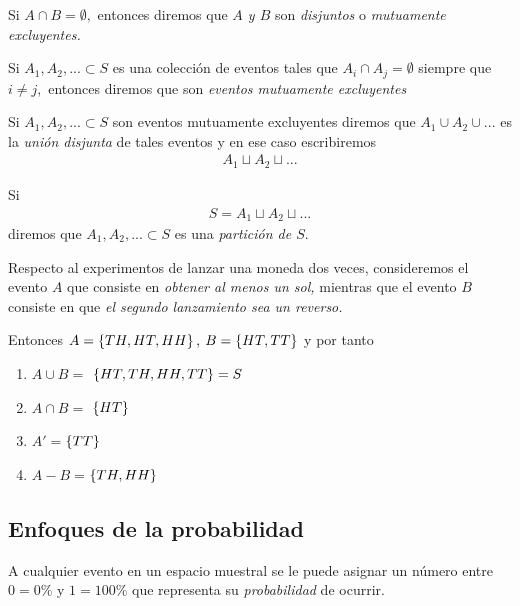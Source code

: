 Si $A\cap B= \emptyset,$ entonces diremos que \emph{$A$ y $B$} son \emph{disjuntos} o \emph{mutuamente excluyentes.} 

\begin{definicion}
	Si $A_{1},A_{2},... \subset S$ es una colección de eventos tales que $A_{i}\cap A_{j}=\emptyset$ siempre que $i\neq j,$ entonces diremos que son \emph{eventos mutuamente excluyentes}
\end{definicion}

\begin{definicion}
	Si $A_{1}, A_{2}, ...\subset S$ son eventos mutuamente excluyentes diremos que $A_{1} \cup A_{2} \cup ... $ es la \emph{unión disjunta} de tales eventos y en ese caso escribiremos
	\begin{align}
		A_{1}\sqcup A_{2} \sqcup ...
	\end{align}
\end{definicion}


\begin{definicion}
	Si \begin{align}
		S=A_{1}\sqcup A_{2} \sqcup ...
	\end{align}
	diremos que $A_{1},A_{2},...\subset S$  es una \emph{partición de $S.$}
\end{definicion}


\begin{ejemplo}
	\label{exmp:1.9}
	Respecto al experimentos de lanzar una moneda dos veces, consideremos el evento $A$ que consiste en \emph{obtener al menos un sol,}  mientras que el evento $B$ consiste en que \emph{el segundo lanzamiento sea un reverso.}
	
	Entonces $A=\left\{ TH,HT,HH \right\},$ $B=\left\{ HT,TT \right\}$ y por tanto 
	\begin{enumerate}
		\item $A\cup B =$ $\left\{ HT,TH,HH,TT \right\}= S$ 
		\item $A\cap B =$ $\left\{ HT \right\}$ 
		\item $A'=$$\left\{ TT \right\}$
		\item $A-B=$$\left\{ TH,HH \right\}$
	\end{enumerate}
	
\end{ejemplo}


\subsection{Enfoques de la probabilidad}

A cualquier evento en un espacio muestral se le puede asignar un número entre $0=0\%$ y $1=100\%$ que representa su \emph{probabilidad} de ocurrir.



